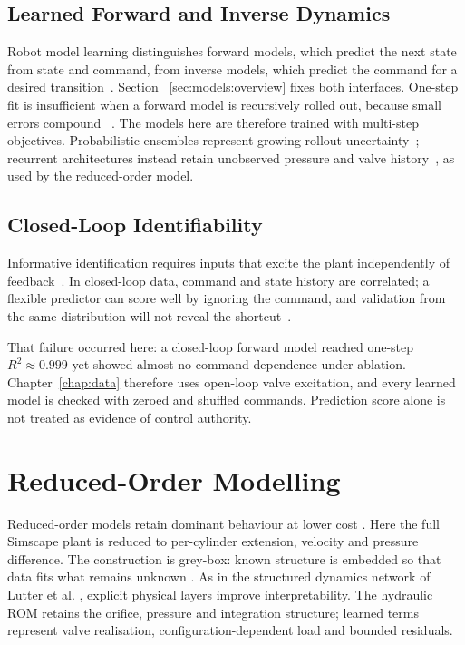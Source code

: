 \subsection{Learned Forward and Inverse Dynamics}

Robot model learning distinguishes forward models, which predict the next
state from state and command, from inverse models, which predict the command
for a desired transition~\cite{nguyentuong2011model}. Section
~\ref{sec:models:overview} fixes both interfaces. One-step fit is insufficient
when a forward model is recursively rolled out, because small errors compound
~\cite{nagabandi2018neural}. The models here are therefore trained with
multi-step objectives. Probabilistic ensembles represent growing rollout
uncertainty~\cite{chua2018deep}; recurrent architectures instead retain
unobserved pressure and valve history~\cite{hochreiter1997long,cho2014learning},
as used by the reduced-order model.

\subsection{Closed-Loop Identifiability}
\label{sec:fund:identifiability}

Informative identification requires inputs that excite the plant independently
of feedback~\cite{ljung1999system,isermann2011identification}. In closed-loop
data, command and state history are correlated; a flexible predictor can score
well by ignoring the command, and validation from the same distribution will
not reveal the shortcut~\cite{schoukens2019nonlinear}.

That failure occurred here: a closed-loop forward model reached one-step
$R^2\approx0.999$ yet showed almost no command dependence under ablation.
Chapter~\ref{chap:data} therefore uses open-loop valve excitation, and every
learned model is checked with zeroed and shuffled commands. Prediction score
alone is not treated as evidence of control authority.

\section{Reduced-Order Modelling}
\label{sec:fund:rom}

Reduced-order models retain dominant behaviour at lower cost
\cite{benner2015survey}. Here the full Simscape plant is reduced to
per-cylinder extension, velocity and pressure difference. The construction is
grey-box: known structure is embedded so that data fits what remains unknown
\cite{karniadakis2021physics}. As in the structured dynamics network of
Lutter et al. \cite{lutter2019deep}, explicit physical layers improve
interpretability. The hydraulic ROM retains the orifice, pressure and
integration structure; learned terms represent valve realisation,
configuration-dependent load and bounded residuals.

